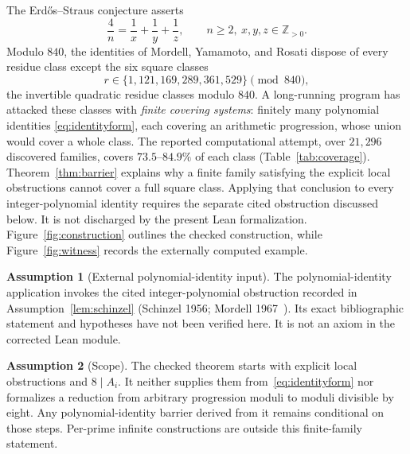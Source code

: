 \documentclass[11pt,a4paper]{article}
\theoremstyle{definition}
\newtheorem{assumption}{Assumption}
\begin{document}
The Erd\H{o}s--Straus conjecture asserts
\begin{equation}
  \label{eq:es}
  \frac{4}{n} = \frac{1}{x}+\frac{1}{y}+\frac{1}{z},
  \qquad n \geq 2,\ x,y,z \in \mathbb{Z}_{>0}.
\end{equation}
Modulo $840$, the identities of Mordell, Yamamoto, and Rosati dispose of
every residue class except the six square classes
\begin{equation}
  \label{eq:squareclasses}
  r \in \{1,121,169,289,361,529\} \pmod{840},
\end{equation}
the invertible quadratic residue classes modulo $840$. A long-running
program has attacked
these classes with \emph{finite covering systems}: finitely many
polynomial identities \eqref{eq:identityform}, each covering an arithmetic
progression, whose union would cover a whole class. The reported
computational attempt, over $21{,}296$ discovered families, covers
$73.5$--$84.9\%$ of each class (Table~\ref{tab:coverage}).
Theorem~\ref{thm:barrier} explains why a finite family satisfying the
explicit local obstructions cannot cover a full square class.
Applying that conclusion to every integer-polynomial identity requires
the separate cited obstruction discussed below. It is not discharged
by the present Lean formalization. Figure~\ref{fig:construction}
outlines the checked construction, while Figure~\ref{fig:witness}
records the externally computed example.

\begin{assumption}[External polynomial-identity input]
  \label{ass:lemma}
  The polynomial-identity application invokes the cited integer-polynomial
  obstruction recorded in Assumption~\ref{lem:schinzel}
  (Schinzel 1956; Mordell 1967~\cite{schinzel1956,mordell1967}).
  Its exact bibliographic statement and hypotheses have not been verified
  here. It is not an axiom in the corrected Lean module.
\end{assumption}

\begin{assumption}[Scope]
  \label{ass:scope}
  The checked theorem starts with explicit local obstructions and
  $8\mid A_i$. It neither supplies them from~\eqref{eq:identityform}
  nor formalizes a reduction from arbitrary progression moduli to
  moduli divisible by eight. Any polynomial-identity barrier derived
  from it remains conditional on those steps. Per-prime infinite
  constructions are outside this finite-family statement.
\end{assumption}
\end{document}
